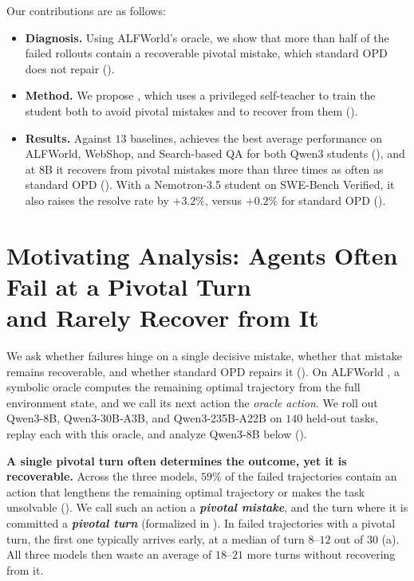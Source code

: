 \documentclass[10pt, logo, onecolumn, copyright]{nv}
\begin{document}
Our contributions are as follows:
\begin{itemize}[leftmargin=3em, topsep=0pt, partopsep=0pt, itemsep=1pt, parsep=0pt]
\item \textbf{Diagnosis.} Using ALFWorld's oracle, we show that more than half of the failed rollouts contain a recoverable pivotal mistake, which standard OPD does not repair ().
\item \textbf{Method.} We propose \method{}, which uses a privileged self-teacher to train the student both to avoid pivotal mistakes and to recover from them ().
\item \textbf{Results.} Against $13$ baselines, \method{} achieves the best average performance on ALFWorld, WebShop, and Search-based QA for both Qwen3 students (), and at 8B it recovers from pivotal mistakes more than three times as often as standard OPD (). With a Nemotron-3.5 student on SWE-Bench Verified, it also raises the resolve rate by $+3.2\%$, versus $+0.2\%$ for standard OPD ().
\end{itemize}


\section{Motivating Analysis: Agents Often Fail at a Pivotal Turn\texorpdfstring{\protect\\}{} and Rarely Recover from It}
\label{sec:evidence}

We ask whether failures hinge on a single decisive mistake, whether that mistake remains recoverable, and whether standard OPD repairs it (). On ALFWorld \citep{shridhar2020alfworld}, a symbolic oracle computes the remaining optimal trajectory from the full environment state, and we call its next action the \emph{oracle action}. We roll out Qwen3-8B, \mbox{Qwen3-30B-A3B}, and \mbox{Qwen3-235B-A22B} \citep{yang2025qwen3} on $140$ held-out tasks, replay each with this oracle, and analyze Qwen3-8B below ().

\textbf{A single pivotal turn often determines the outcome, yet it is recoverable.}
Across the three models, $59\%$ of the failed trajectories contain an action that lengthens the remaining optimal trajectory or makes the task unsolvable (). We call such an action a \textbf{\emph{pivotal mistake}}, and the turn where it is committed a \textbf{\emph{pivotal turn}} (formalized in ). In failed trajectories with a pivotal turn, the first one typically arrives early, at a median of turn $8
$--$12$ out of $30$ (a). All three models then waste an average of $18$--$21$ more turns without recovering from it. 
\end{document}
